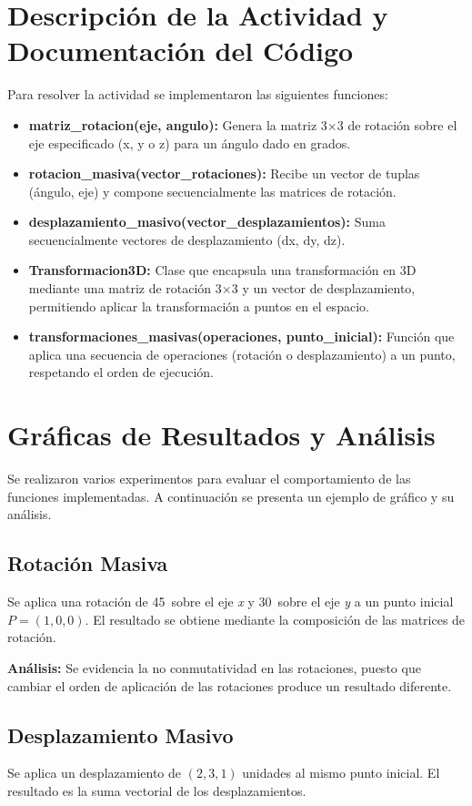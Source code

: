 \documentclass[a4paper, 10pt]{article}
\begin{document}
\section{Descripción de la Actividad y Documentación del Código}
Para resolver la actividad se implementaron las siguientes funciones:
\begin{itemize}
    \item \textbf{matriz\_rotacion(eje, angulo):} Genera la matriz 3$\times$3 de rotación sobre el eje especificado (x, y o z) para un ángulo dado en grados.
    \item \textbf{rotacion\_masiva(vector\_rotaciones):} Recibe un vector de tuplas (ángulo, eje) y compone secuencialmente las matrices de rotación.
    \item \textbf{desplazamiento\_masivo(vector\_desplazamientos):} Suma secuencialmente vectores de desplazamiento (dx, dy, dz).
    \item \textbf{Transformacion3D:} Clase que encapsula una transformación en 3D mediante una matriz de rotación 3$\times$3 y un vector de desplazamiento, permitiendo aplicar la transformación a puntos en el espacio.
    \item \textbf{transformaciones\_masivas(operaciones, punto\_inicial):} Función que aplica una secuencia de operaciones (rotación o desplazamiento) a un punto, respetando el orden de ejecución.
\end{itemize}


\section{Gráficas de Resultados y Análisis}
Se realizaron varios experimentos para evaluar el comportamiento de las funciones implementadas. A continuación se presenta un ejemplo de gráfico y su análisis.

\subsection{Rotación Masiva}
Se aplica una rotación de 45\textdegree~sobre el eje \textit{x} y 30\textdegree~sobre el eje \textit{y} a un punto inicial $P = (1, 0, 0)$. El resultado se obtiene mediante la composición de las matrices de rotación.

\textbf{Análisis:}  
 Se evidencia la no conmutatividad en las rotaciones, puesto que cambiar el orden de aplicación de las rotaciones produce un resultado diferente.

\subsection{Desplazamiento Masivo}
Se aplica un desplazamiento de $(2, 3, 1)$ unidades al mismo punto inicial. El resultado es la suma vectorial de los desplazamientos.
\end{document}

